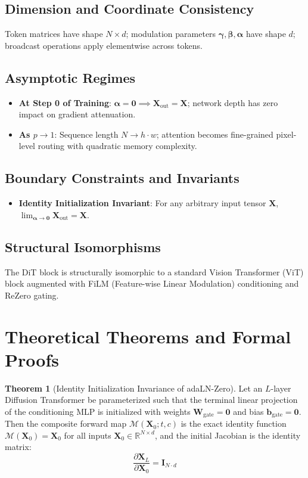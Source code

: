 \documentclass[11pt,a4paper]{article}
\theoremstyle{definition}
\newtheorem{theorem}{\textbf{Theorem}}[section]
\begin{document}
\subsection{Dimension and Coordinate Consistency}
Token matrices have shape $N \times d$; modulation parameters $\boldsymbol{\gamma}, \boldsymbol{\beta}, \boldsymbol{\alpha}$ have shape $d$; broadcast operations apply elementwise across tokens.

\subsection{Asymptotic Regimes}
\begin{itemize}
    \item \textbf{At Step 0 of Training}: $\boldsymbol{\alpha} = \mathbf{0} \implies \mathbf{X}_{\text{out}} = \mathbf{X}$; network depth has zero impact on gradient attenuation.
    \item \textbf{As $p \to 1$}: Sequence length $N \to h \cdot w$; attention becomes fine-grained pixel-level routing with quadratic memory complexity.
\end{itemize}

\subsection{Boundary Constraints and Invariants}
\begin{itemize}
    \item \textbf{Identity Initialization Invariant}: For any arbitrary input tensor $\mathbf{X}$, $\lim_{\boldsymbol{\alpha} \to \mathbf{0}} \mathbf{X}_{\text{out}} = \mathbf{X}$.
\end{itemize}

\subsection{Structural Isomorphisms}
The DiT block is structurally isomorphic to a standard Vision Transformer (ViT) block augmented with FiLM (Feature-wise Linear Modulation) conditioning and ReZero gating.

\section{Theoretical Theorems and Formal Proofs}

\begin{theorem}[Identity Initialization Invariance of adaLN-Zero]
Let an $L$-layer Diffusion Transformer be parameterized such that the terminal linear projection of the conditioning MLP is initialized with weights $\mathbf{W}_{\text{gate}} = \mathbf{0}$ and bias $\mathbf{b}_{\text{gate}} = \mathbf{0}$. Then the composite forward map $\mathcal{M}(\mathbf{X}_0; t, c)$ is the exact identity function $\mathcal{M}(\mathbf{X}_0) = \mathbf{X}_0$ for all inputs $\mathbf{X}_0 \in \mathbb{R}^{N \times d}$, and the initial Jacobian is the identity matrix:
{\boldmath
\begin{equation}
\frac{\partial \mathbf{X}_L}{\partial \mathbf{X}_0} = \mathbf{I}_{N \cdot d}
\end{equation}
}
\end{theorem}
\end{document}
